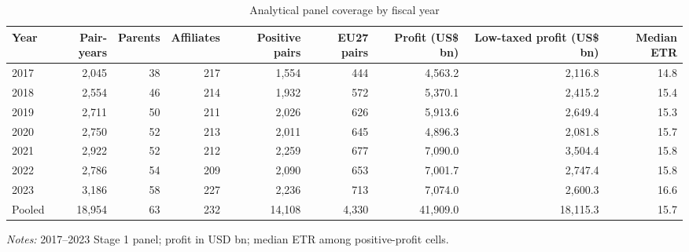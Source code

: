 \begin{table}[H]
\centering
\footnotesize
\setlength{\tabcolsep}{3pt}
\caption[Analytical panel coverage by fiscal year]{Analytical panel coverage by fiscal year}
\label{tab:data_panel_coverage}
\begin{tabular}{@{}lrrrrrrrr@{}}
\toprule
Year & Pair-years & Parents & Affiliates & Positive pairs & EU27 pairs & Profit (US\$ bn) & Low-taxed profit (US\$ bn) & Median ETR \\
\midrule
2017 & 2,045 & 38 & 217 & 1,554 & 444 & 4,563.2 & 2,116.8 & 14.8 \\
2018 & 2,554 & 46 & 214 & 1,932 & 572 & 5,370.1 & 2,415.2 & 15.4 \\
2019 & 2,711 & 50 & 211 & 2,026 & 626 & 5,913.6 & 2,649.4 & 15.3 \\
2020 & 2,750 & 52 & 213 & 2,011 & 645 & 4,896.3 & 2,081.8 & 15.7 \\
2021 & 2,922 & 52 & 212 & 2,259 & 677 & 7,090.0 & 3,504.4 & 15.8 \\
2022 & 2,786 & 54 & 209 & 2,090 & 653 & 7,001.7 & 2,747.4 & 15.8 \\
2023 & 3,186 & 58 & 227 & 2,236 & 713 & 7,074.0 & 2,600.3 & 16.6 \\
Pooled & 18,954 & 63 & 232 & 14,108 & 4,330 & 41,909.0 & 18,115.3 & 15.7 \\
\bottomrule
\end{tabular}

\vspace{0.35em}
\noindent\begin{minipage}{\textwidth}
\footnotesize\raggedright\textit{Notes:} 2017--2023 Stage 1 panel; profit in USD bn; median ETR among positive-profit cells.
\end{minipage}
\end{table}
